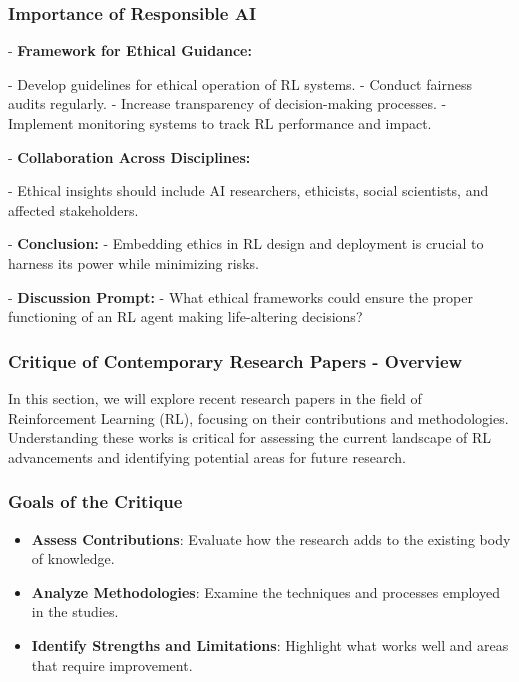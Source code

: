 \documentclass{beamer}
\begin{document}
\begin{frame}[fragile]
    \frametitle{Importance of Responsible AI}
    - \textbf{Framework for Ethical Guidance:}
        \begin{itemize}
            - Develop guidelines for ethical operation of RL systems.
            - Conduct fairness audits regularly.
            - Increase transparency of decision-making processes.
            - Implement monitoring systems to track RL performance and impact.
        \end{itemize}

    - \textbf{Collaboration Across Disciplines:}
        \begin{itemize}
            - Ethical insights should include AI researchers, ethicists, social scientists, and affected stakeholders.
        \end{itemize}
    
    - \textbf{Conclusion:}
        - Embedding ethics in RL design and deployment is crucial to harness its power while minimizing risks.
        
    - \textbf{Discussion Prompt:}
        - What ethical frameworks could ensure the proper functioning of an RL agent making life-altering decisions?
\end{frame}

\begin{frame}[fragile]
    \frametitle{Critique of Contemporary Research Papers - Overview}
    In this section, we will explore recent research papers in the field of Reinforcement Learning (RL), focusing on their contributions and methodologies. Understanding these works is critical for assessing the current landscape of RL advancements and identifying potential areas for future research.
\end{frame}

\begin{frame}[fragile]
    \frametitle{Goals of the Critique}
    \begin{itemize}
        \item \textbf{Assess Contributions}: Evaluate how the research adds to the existing body of knowledge.
        \item \textbf{Analyze Methodologies}: Examine the techniques and processes employed in the studies.
        \item \textbf{Identify Strengths and Limitations}: Highlight what works well and areas that require improvement.
    \end{itemize}
\end{frame}
\end{document}
